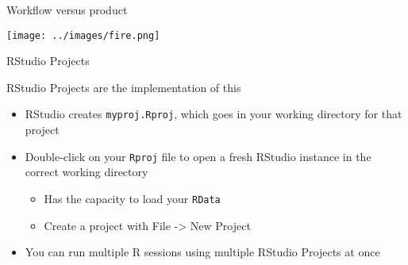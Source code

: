 \documentclass[ignorenonframetext,]{beamer}
\providecommand{\tightlist}{%
  \setlength{\itemsep}{0pt}\setlength{\parskip}{0pt}}
\begin{document}
\begin{frame}{Workflow versus product}
\protect\hypertarget{workflow-versus-product-5}{}

\texttt{[image: ../images/fire.png]}

\end{frame}

\begin{frame}[fragile]{RStudio Projects}
\protect\hypertarget{rstudio-projects}{}

RStudio Projects are the implementation of this

\begin{itemize}
\tightlist
\item
  RStudio creates \texttt{myproj.Rproj}, which goes in your working
  directory for that project
\item
  Double-click on your \texttt{Rproj} file to open a fresh RStudio
  instance in the correct working directory

  \begin{itemize}
  \tightlist
  \item
    Has the capacity to load your \texttt{RData}
  \item
    Create a project with File -\textgreater{} New Project
  \end{itemize}
\item
  You can run multiple R sessions using multiple RStudio Projects at
  once
\end{itemize}

\end{frame}
\end{document}
